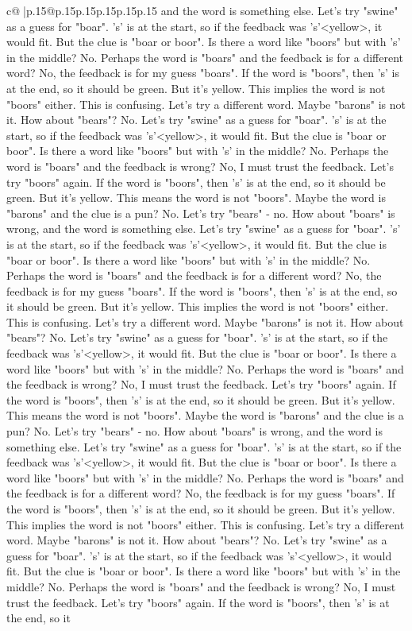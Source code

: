 \documentclass{article}
\begin{document}
{\begin{supertabular}{c@{$\;$}|p{.15\linewidth}@{}p{.15\linewidth}p{.15\linewidth}p{.15\linewidth}p{.15\linewidth}p{.15\linewidth}}
{{{and the word is something else. Let's try "swine" as a guess for "boar". 's' is at the start, so if the feedback was 's'<yellow>, it would fit. But the clue is "boar or boor". Is there a word like "boors" but with 's' in the middle? No. Perhaps the word is "boars" and the feedback is for a different word? No, the feedback is for my guess "boars". If the word is "boors", then 's' is at the end, so it should be green. But it's yellow. This implies the word is not "boors" either. This is confusing. Let's try a different word. Maybe "barons" is not it. How about "bears"? No. Let's try "swine" as a guess for "boar". 's' is at the start, so if the feedback was 's'<yellow>, it would fit. But the clue is "boar or boor". Is there a word like "boors" but with 's' in the middle? No. Perhaps the word is "boars" and the feedback is wrong? No, I must trust the feedback. Let's try "boors" again. If the word is "boors", then 's' is at the end, so it should be green. But it's yellow. This means the word is not "boors". Maybe the word is "barons" and the clue is a pun? No. Let's try "bears" {-} no. How about "boars" is wrong, and the word is something else. Let's try "swine" as a guess for "boar". 's' is at the start, so if the feedback was 's'<yellow>, it would fit. But the clue is "boar or boor". Is there a word like "boors" but with 's' in the middle? No. Perhaps the word is "boars" and the feedback is for a different word? No, the feedback is for my guess "boars". If the word is "boors", then 's' is at the end, so it should be green. But it's yellow. This implies the word is not "boors" either. This is confusing. Let's try a different word. Maybe "barons" is not it. How about "bears"? No. Let's try "swine" as a guess for "boar". 's' is at the start, so if the feedback was 's'<yellow>, it would fit. But the clue is "boar or boor". Is there a word like "boors" but with 's' in the middle? No. Perhaps the word is "boars" and the feedback is wrong? No, I must trust the feedback. Let's try "boors" again. If the word is "boors", then 's' is at the end, so it should be green. But it's yellow. This means the word is not "boors". Maybe the word is "barons" and the clue is a pun? No. Let's try "bears" {-} no. How about "boars" is wrong, and the word is something else. Let's try "swine" as a guess for "boar". 's' is at the start, so if the feedback was 's'<yellow>, it would fit. But the clue is "boar or boor". Is there a word like "boors" but with 's' in the middle? No. Perhaps the word is "boars" and the feedback is for a different word? No, the feedback is for my guess "boars". If the word is "boors", then 's' is at the end, so it should be green. But it's yellow. This implies the word is not "boors" either. This is confusing. Let's try a different word. Maybe "barons" is not it. How about "bears"? No. Let's try "swine" as a guess for "boar". 's' is at the start, so if the feedback was 's'<yellow>, it would fit. But the clue is "boar or boor". Is there a word like "boors" but with 's' in the middle? No. Perhaps the word is "boars" and the feedback is wrong? No, I must trust the feedback. Let's try "boors" again. If the word is "boors", then 's' is at the end, so it }}}
\end{supertabular}}
\end{document}
